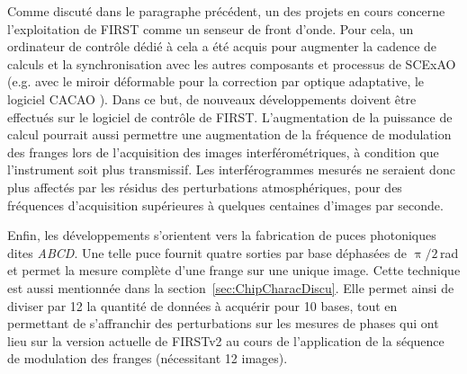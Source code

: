 Comme discuté dans le paragraphe précédent, un des projets en cours concerne l'exploitation de \ac{FIRST} comme un senseur de front d'onde. Pour cela, un ordinateur de contrôle dédié à cela a été acquis pour augmenter la cadence de calculs et la synchronisation avec les autres composants et processus de \ac{SCExAO} (e.g. avec le miroir déformable pour la correction par optique adaptative, le logiciel \ac{CACAO} \citep{guyon2020}). Dans ce but, de nouveaux développements doivent être effectués sur le logiciel de contrôle de \ac{FIRST}. L'augmentation de la puissance de calcul pourrait aussi permettre une augmentation de la fréquence de modulation des franges lors de l'acquisition des images interférométriques, à condition que l'instrument soit plus transmissif. Les interférogrammes mesurés ne seraient donc plus affectés par les résidus des perturbations atmosphériques, pour des fréquences d'acquisition supérieures à quelques centaines d'images par seconde.

Enfin, les développements s'orientent vers la fabrication de puces photoniques dites \textit{ABCD}. Une telle puce fournit quatre sorties par base déphasées de $\uppi / 2 \,$rad et permet la mesure complète d'une frange sur une unique image. Cette technique est aussi mentionnée dans la section~\ref{sec:ChipCharacDiscu}. Elle permet ainsi de diviser par 12 la quantité de données à acquérir pour 10 bases, tout en permettant de s'affranchir des perturbations sur les mesures de phases qui ont lieu sur la version actuelle de \ac{FIRSTv2} au cours de l'application de la séquence de modulation des franges (nécessitant 12 images).


